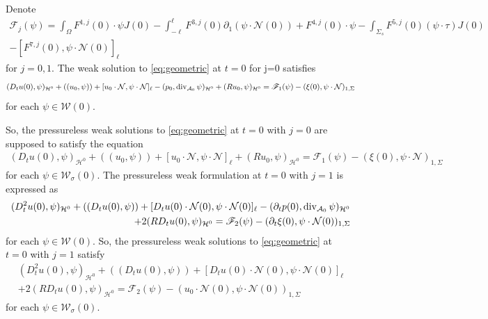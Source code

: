 \documentclass[letterpaper,reqno,10pt,twoside]{amsart}
\theoremstyle{definition}
\theoremstyle{remark}
\def\p{\partial}
\def\Om{\Omega}
\def\dive{\mathop{\rm div}\nolimits}
\begin{document}
\begin{appendix}
			Denote 
			\[
			\begin{aligned}
				\mathscr{F}_j(\psi)=\int_{\Om}F^{1,j}(0)\cdot \psi J(0)-\int_{-\ell}^{\ell} F^{3,j}(0)\p_1(\psi\cdot\mathcal{N}(0))+F^{4,j}(0)\cdot\psi -\int_{\Sigma_s}F^{5,j}(0)(\psi\cdot\tau)J(0)\\-[F^{7,j}(0),\psi\cdot\mathcal{N}(0)]_\ell
			\end{aligned}
			\]
			for $j=0, 1$.
			The weak solution to \eqref{eq:geometric} at $t=0$ for j=0 satisfies
			\begin{equation}\label{eq:couple5}
				\begin{aligned}
					(D_tu(0),\psi)_{\mathcal{H}^0}+((u_0,\psi))+[u_0\cdot\mathcal{N},\psi\cdot\mathcal{N}]_\ell-(p_0, \dive_{\mathcal{A}_0}\psi)_{\mathcal{H}^0}
					+(Ru_0,\psi)_{\mathcal{H}^0}=\mathscr{F}_1(\psi)-(\xi(0),\psi\cdot\mathcal{N})_{1,\Sigma}
				\end{aligned}
			\end{equation}
			for each $\psi\in\mathcal{W}(0)$.
			
			So, the pressureless weak solutions to \eqref{eq:geometric} at $t=0$ with $j=0$ are supposed to satisfy the equation
			\begin{equation}\label{eq:initial_p}
				\begin{aligned}
					(D_tu(0),\psi)_{\mathcal{H}^0}+((u_0,\psi))+[u_0\cdot\mathcal{N},\psi\cdot\mathcal{N}]_\ell
					+(Ru_0,\psi)_{\mathcal{H}^0}=\mathscr{F}_1(\psi)-(\xi(0),\psi\cdot\mathcal{N})_{1,\Sigma}
				\end{aligned}
			\end{equation}
			for each $\psi\in\mathcal{W}_\sigma(0)$.
			The pressureless weak formulation at $t=0$ with $j=1$  is expressed as
			\begin{equation}\label{eq:couple2}
				\begin{aligned}
					(D_t^2u(0),\psi)_{\mathcal{H}^0}
					+((D_tu(0),\psi))+[D_tu(0)\cdot\mathcal{N}(0),\psi\cdot\mathcal{N}(0)]_\ell-(\p_tp(0), \dive_{\mathcal{A}_0}\psi)_{\mathcal{H}^0}\\
					+2(RD_tu(0),\psi)_{\mathcal{H}^0}=\mathscr{F}_2(\psi)-(\p_t\xi(0),\psi\cdot\mathcal{N}(0))_{1,\Sigma}
				\end{aligned}
			\end{equation}
			for each $\psi\in\mathcal{W}(0)$.
			So, the pressureless weak solutions to \eqref{eq:geometric} at $t=0$ with $j=1$ satisfy
			\begin{equation}\label{eq:initial_p2}
				\begin{aligned}
					(D_t^2u(0),\psi)_{\mathcal{H}^0}
					+((D_tu(0),\psi))+[D_tu(0)\cdot\mathcal{N}(0),\psi\cdot\mathcal{N}(0)]_\ell\\
					+2(RD_tu(0),\psi)_{\mathcal{H}^0}=\mathscr{F}_2(\psi)-(u_0\cdot\mathcal{N}(0),\psi\cdot\mathcal{N}(0))_{1,\Sigma}
				\end{aligned}
			\end{equation}
			for each $\psi\in\mathcal{W}_\sigma(0)$.
			

\end{appendix}
\end{document}
